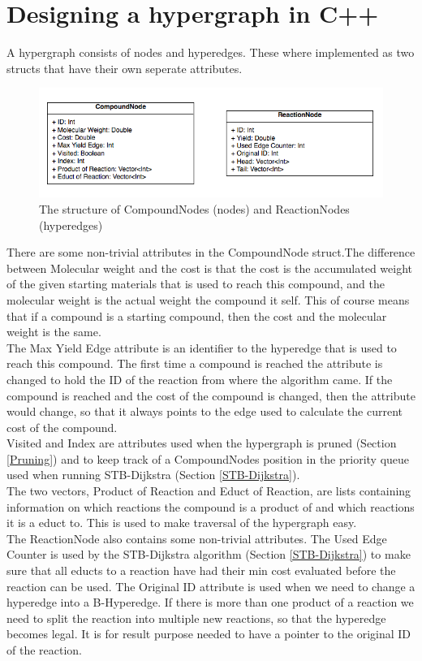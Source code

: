 \documentclass[a4paper,10pt,titlepage]{paper}
\begin{document}
\section{Designing a hypergraph in C++}
\label{sec::DesigningHyper}
A hypergraph consists of nodes and hyperedges. These where implemented as two structs that have their own seperate attributes.
\begin{figure}[H]
\centering
\includegraphics[scale=0.5]{Billeder/Compound-ReactionNode.png}
\caption{The structure of CompoundNodes (nodes) and ReactionNodes (hyperedges)}
\end{figure}
There are some non-trivial attributes in the CompoundNode struct.The difference between Molecular weight and the cost is that the cost is the accumulated weight of the given starting materials that is used to reach this compound, and the molecular weight is the actual weight the compound it self. This of course means that if a compound is a starting compound, then the cost and the molecular weight is the same.\\ The Max Yield Edge attribute is an identifier to the hyperedge that is used to reach this compound. The first time a compound is reached the attribute is changed to hold the ID of the reaction from where the algorithm came. If the compound is reached and the cost of the compound is changed, then the attribute would change, so that it always points to the edge used to calculate the current cost of the compound.\\
Visited and Index are attributes used when the hypergraph is pruned (Section \ref{Pruning}) and to keep track of a CompoundNodes position in the priority queue used when running STB-Dijkstra (Section \ref{STB-Dijkstra}).\\
The two vectors, Product of Reaction and Educt of Reaction, are lists containing information on which reactions the compound is a product of and which reactions it is a educt to. This is used to make traversal of the hypergraph easy.\\

The ReactionNode also contains some non-trivial attributes. The Used Edge Counter is used by the STB-Dijkstra algorithm (Section \ref{STB-Dijkstra}) to make sure that all educts to a reaction have had their min cost evaluated before the reaction can be used. The Original ID attribute is used when we need to change a hyperedge into a B-Hyperedge. If there is more than one product of a reaction we need to split the reaction into multiple new reactions, so that the hyperedge becomes legal. It is for result purpose needed to have a pointer to the original ID of the reaction.\\
\end{document}
